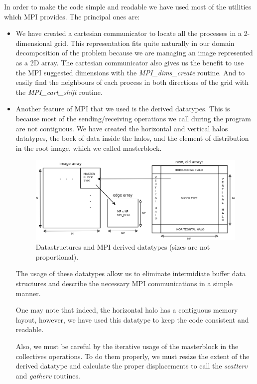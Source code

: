 \documentclass[12pt, a4paper, oneside]{article}
\begin{document}
In order to make the code simple and readable we have used most of the utilities which MPI provides. The principal ones are:
\begin{itemize}
\item We have created a cartesian communicator to locate all the processes in a 2-dimensional grid.
This representation fits quite naturally in our domain decomposition of the problem because we are managing an image represented as a 2D array.
The cartesian communicator also gives us the benefit to use the MPI suggested dimensions with the \emph{MPI\_dims\_create} routine.
And to easily find the neighbours of each process in both directions of the grid with the \emph{MPI\_cart\_shift} routine.

\item Another feature of MPI that we used is the derived datatypes.
This is because most of the sending/receiving operations we call during the program are not contiguous.
We have created the horizontal and vertical halos datatypes, the bock of data inside the halos, and the element of distribution in the root image, which we called masterblock.

\begin{figure}[htbp]
 \centering
 \includegraphics[width=\textwidth]{datatypes}
 \caption{Datastructures and MPI derived datatypes (sizes are not proportional).}
 \label{figure:datatypes}
\end{figure}

The usage of these datatypes allow us to eliminate intermidiate buffer data structures and describe the necessary MPI communications in a simple manner.

One may note that indeed, the horizontal halo has a contiguous memory layout, however, we have used this datatype to keep the code consistent and readable.

Also, we must be careful by the iterative usage of the masterblock in the collectives operations. To do them properly, we must resize the extent of the derived datatype and calculate the proper displacements to call the \emph{scatterv} and \emph{gatherv} routines.



\end{itemize}
\end{document}

